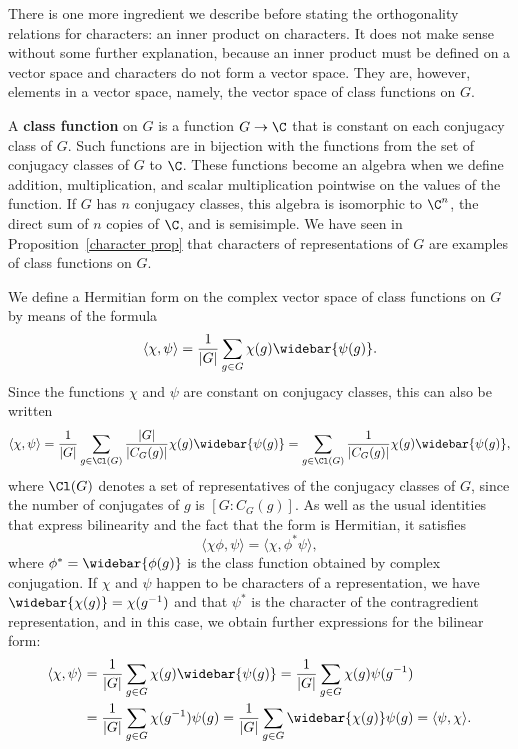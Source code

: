 There is one more ingredient we describe before stating the orthogonality relations for characters: an inner product on characters. It does not make sense without some further explanation, because an inner product must be defined on a vector space and characters do not form a vector space. They are, however, elements in a vector space, namely, the vector space of class functions on $G$.\par
A \textbf{class function} on $G$ is a function $G\to\C$ that is constant on each conjugacy class of $G$. Such functions are in bijection with the functions from the set of conjugacy classes of $G$ to $\C$. These functions become an algebra when we define addition, multiplication, and scalar multiplication pointwise on the values of the function. If $G$ has $n$ conjugacy classes, this algebra is isomorphic to $\C^n$, the direct sum of $n$ copies of $\C$, and is semisimple. We have seen in Proposition~\ref{character prop} that characters of representations of $G$ are examples of class functions on $G$.\par
We define a Hermitian form on the complex vector space of class functions on $G$ by means of the formula
\[\langle\chi,\psi\rangle=\frac{1}{|G|}\sum_{g\in G}\chi(g)\widebar{\psi(g)}.\]
Since the functions $\chi$ and $\psi$ are constant on conjugacy classes, this can also be written
\begin{align}\label{inner product on class function other forms}
\langle\chi,\psi\rangle=\frac{1}{|G|}\sum_{g\in\Cl(G)}\frac{|G|}{|C_G(g)|}\chi(g)\widebar{\psi(g)}=\sum_{g\in\Cl(G)}\frac{1}{|C_G(g)|}\chi(g)\widebar{\psi(g)},
\end{align}
where $\Cl(G)$ denotes a set of representatives of the conjugacy classes of $G$, since the number of conjugates of $g$ is $[G:C_G(g)]$. As well as the usual identities that express bilinearity and the fact that the form is Hermitian, it satisfies
\[\langle\chi\phi,\psi\rangle=\langle\chi,\phi^*\psi\rangle,\]
where $\phi^*=\widebar{\phi(g)}$ is the class function obtained by complex conjugation. If $\chi$ and $\psi$ happen to be characters of a representation, we have $\widebar{\chi(g)}=\chi(g^{-1})$ and that $\psi^*$ is the character of the contragredient representation, and in this case, we obtain further expressions for the bilinear form:
\begin{align*}
\langle\chi,\psi\rangle&=\frac{1}{|G|}\sum_{g\in G}\chi(g)\widebar{\psi(g)}=\frac{1}{|G|}\sum_{g\in G}\chi(g)\psi(g^{-1})\\
&=\frac{1}{|G|}\sum_{g\in G}\chi(g^{-1})\psi(g)=\frac{1}{|G|}\sum_{g\in G}\widebar{\chi(g)}\psi(g)=\langle\psi,\chi\rangle.
\end{align*}
